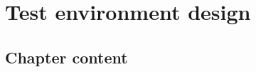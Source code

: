 \cleardoublepage
\section{Test environment design} \label{chap:envir}


\subsection{Chapter content}

